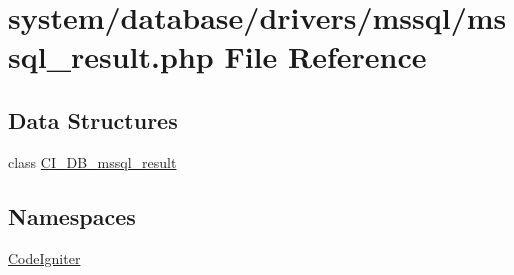 \hypertarget{mssql__result_8php}{\section{system/database/drivers/mssql/mssql\-\_\-result.php File Reference}
\label{mssql__result_8php}
}
\subsection*{Data Structures}
\begin{DoxyCompactItemize}
\item 
class \hyperlink{class_c_i___d_b__mssql__result}{C\-I\-\_\-\-D\-B\-\_\-mssql\-\_\-result}
\end{DoxyCompactItemize}
\subsection*{Namespaces}
\begin{DoxyCompactItemize}
\item 
\hyperlink{namespace_code_igniter}{Code\-Igniter}
\end{DoxyCompactItemize}
